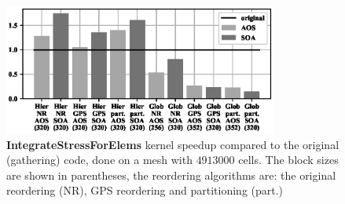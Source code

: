 
\begin{figure}[Htbp]
  \centering
  \includegraphics[width=9cm]{fig/lulesh_speedup.eps}
  \caption{\textbf{IntegrateStressForElems} kernel speedup compared to the
  original (gathering) code, done on a mesh with $4913000$ cells. The block
  sizes are shown in parentheses, the reordering algorithms are: the original
  reordering (NR), GPS reordering and partitioning (part.)}
  \label{fig:lulesh_speedup}
\end{figure}

